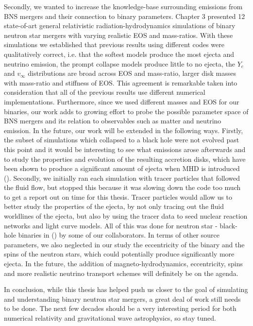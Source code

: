 Secondly, we wanted to increase the knowledge-base surrounding emissions from BNS mergers and their connection to binary parameters. Chapter 3 presented 12 state-of-art general relativistic radiation-hydrodynamics simulations of binary neutron star mergers with varying realistic EOS and mass-ratios.  With these simulations we established that previous results using different codes were qualitatively correct, i.e. that the softest models produce the most ejecta and neutrino emission, the prompt collapse models produce little to no ejecta, the $Y_e$ and $v_\infty$ distributions are broad across EOS and mass-ratio, larger disk masses with mass-ratio and stiffness of EOS. This agreement is remarkable taken into consideration that all of the previous results use different numerical implementations. Furthermore, since we used different masses and EOS for our binaries, our work adds to growing effort to probe the possible parameter space of BNS mergers and its relation to observables such as matter and neutrino emission.  In the future, our work will be extended in the following ways. Firstly, the subset of simulations which collapsed to a black hole were not evolved past this point and it would be interesting to see what emissions arose afterwards and to study the properties and evolution of the resulting accretion disks, which have been shown to produce a significant amount of ejecta when MHD is introduced (\cite{fernandez2019long}). Secondly, we initially ran each simulation with tracer particles that followed the fluid flow, but stopped this because it was slowing down the code too much to get a report out on time for this thesis. Tracer particles would allow us to better study the properties of the ejecta, by not only tracing out the fluid worldlines of the ejecta, but also by using the tracer data to seed nuclear reaction networks and light curve models. All of this was done for neutron star - black-hole binaries in (\cite{fernandez2016dynamics}) by some of our collaborators. In terms of other source parameters, we also neglected in our study the eccentricity of the binary and the spins of the neutron stars, which could potentially produce significantly more ejecta. In the future, the addition of magneto-hydrodynamics, eccentricity, spins and more realistic neutrino transport schemes will definitely be on the agenda.

In conclusion, while this thesis has helped push us closer to the goal of simulating and understanding binary neutron star mergers, a great deal of work still needs to be done. The next few decades should be a very interesting period for both numerical relativity and gravitational wave astrophysics, so stay tuned.

